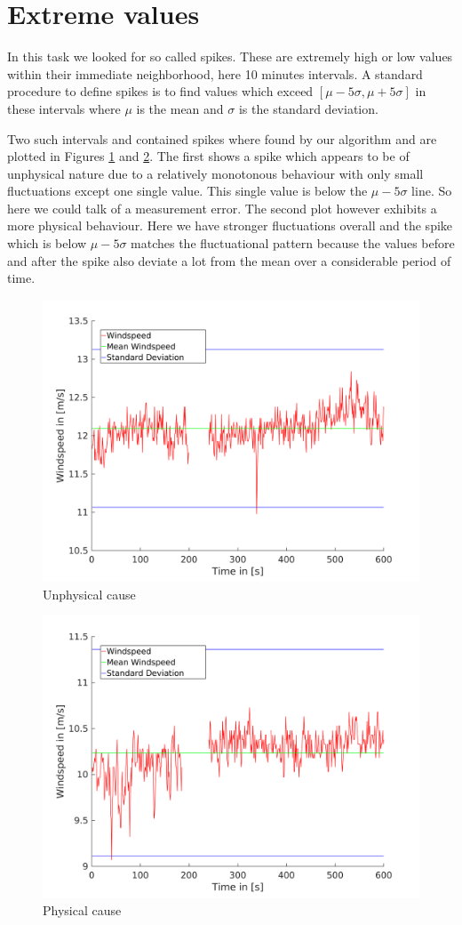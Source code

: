 \documentclass[10pt]{article}
\begin{document}
\section{Extreme values}
In this task we looked for so called spikes. These are extremely high or low values within their immediate neighborhood, here 10 minutes intervals. A standard procedure to define spikes is to find values which exceed $[\mu - 5\sigma , \mu+5\sigma]$ in these intervals where $\mu$ is the mean and $\sigma$ is the standard deviation. 

Two such intervals and contained spikes where found by our algorithm and are plotted in Figures \ref{fig:spikeUnphys} and \ref{fig:spikePhys}. The first shows a spike which appears to be of unphysical nature due to a relatively monotonous behaviour with only small fluctuations except one single value. This single value is below the $\mu-5\sigma$ line. So here we could talk of a measurement error. The second plot however exhibits a more physical behaviour. Here we have stronger fluctuations overall and the spike which is below $\mu-5\sigma$ matches the fluctuational pattern because the values before and after the spike also deviate a lot from the mean over a considerable period of time.


\begin{figure}[Htb!]
  \centering
  \includegraphics[width=0.65\linewidth]{../Plots/spikesintervall440.png}
  \caption{Unphysical cause}
  \label{fig:spikeUnphys}
\end{figure}
\begin{figure}[Htb!]
  \centering
  \includegraphics[width=0.65\linewidth]{../Plots/spikesintervall942.png}
  \caption{Physical cause}
    \label{fig:spikePhys}
\end{figure}
\end{document}
